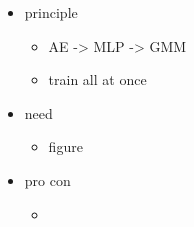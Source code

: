 \documentclass[../description.tex]{subfiles}
\begin{document}
    \begin{itemize}
        \item principle
        \begin{itemize}
            \item AE -> MLP -> GMM
            \item train all at once 
        \end{itemize}
        \item need 
        \begin{itemize}
            \item figure
        \end{itemize}
        \item pro con 
        \begin{itemize}
            \item 
        \end{itemize}
    \end{itemize}
\end{document}

